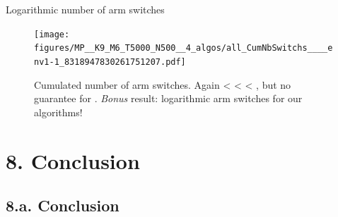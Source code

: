 \documentclass[12pt,english,ignorenonframetext,]{beamer}
\begin{document}
\begin{frame}[plain]{Logarithmic number of arm switches}

\begin{figure}[h!]
\centering
\texttt{[image: figures/MP\_\_K9\_M6\_T5000\_N500\_\_4\_algos/all\_CumNbSwitchs\_\_\_\_env1-1\_8318947830261751207.pdf]}
\caption{\footnotesize{Cumulated number of arm switches. Again \textcolor{blue}{\rhoRand{}} < \textcolor{red}{\RandTopM{}} < \textcolor{bluegreen}{\Selfish{}} < \textcolor{yellowgreen}{\MCTopM{}}, but no guarantee for \textcolor{blue}{\rhoRand{}}. \emph{Bonus} result: logarithmic arm switches for our algorithms!}}
\end{figure}

\end{frame}







\section{\hfill{}8. Conclusion\hfill{}}
\subsection{\hfill{}8.a. Conclusion\hfill{}}
\end{document}
